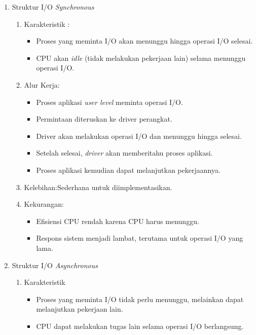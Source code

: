 \documentclass[12pt]{article}
\begin{document}
\begin{enumerate}
    \item Struktur I/O \emph{Synchronous} 
    \begin{enumerate}
        \item Karakteristik :
        \begin{itemize}
            \item Proses yang meminta I/O akan menunggu hingga operasi I/O selesai.
            \item CPU akan \emph{idle} (tidak melakukan pekerjaan lain) selama menunggu operasi I/O.
        \end{itemize}
        \item Alur Kerja:
        \begin{itemize}
            \item Proses aplikasi \emph{user level} meminta operasi I/O.
            \item Permintaan diteruskan ke driver perangkat.
            \item Driver akan melakukan operasi I/O dan menunggu hingga selesai.
            \item Setelah selesai, \textit{driver} akan memberitahu proses aplikasi.
            \item Proses aplikasi kemudian dapat melanjutkan pekerjaannya.
        \end{itemize}
        \item Kelebihan:Sederhana untuk diimplementasikan.
        \item Kekurangan:
        \begin{itemize}
            \item Efisiensi CPU rendah karena CPU harus menunggu.
            \item Respons sistem menjadi lambat, terutama untuk operasi I/O yang lama.    
        \end{itemize}
    \end{enumerate}
    \item Struktur I/O \emph{Asynchronous}
    \begin{enumerate}
        \item Karakteristik
        \begin{itemize}
            \item Proses yang meminta I/O tidak perlu menunggu, melainkan dapat melanjutkan pekerjaan lain.
            \item CPU dapat melakukan tugas lain selama operasi I/O berlangsung.  
        \end{itemize}

\end{enumerate}
\end{enumerate}
\end{document}
